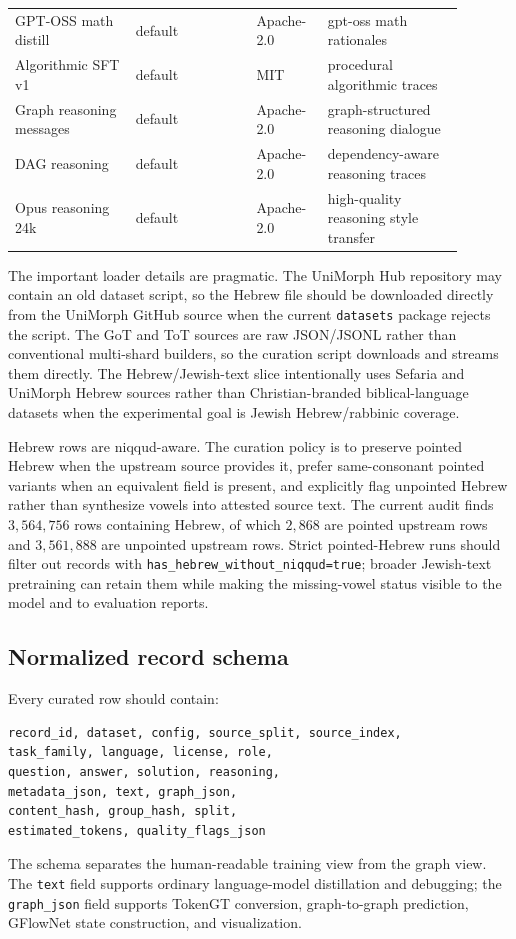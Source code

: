\documentclass[11pt]{article}
\theoremstyle{definition}
\theoremstyle{plain}
\theoremstyle{remark}
\numberwithin{equation}{section}
\begin{document}
{\begin{longtable}{>{\raggedright\arraybackslash}p{0.24\linewidth}>{\raggedright\arraybackslash}p{0.24\linewidth}>{\raggedright\arraybackslash}p{0.14\linewidth}>{\raggedright\arraybackslash}p{0.27\linewidth}}
GPT-OSS math distill & default & Apache-2.0 & gpt-oss math rationales \\
Algorithmic SFT v1 & default & MIT & procedural algorithmic traces \\
Graph reasoning messages & default & Apache-2.0 & graph-structured reasoning dialogue \\
DAG reasoning & default & Apache-2.0 & dependency-aware reasoning traces \\
Opus reasoning 24k & default & Apache-2.0 & high-quality reasoning style transfer \\
\bottomrule
\end{longtable}
}

The important loader details are pragmatic.  The UniMorph Hub repository may contain an old dataset script, so the Hebrew file should be downloaded directly from the UniMorph GitHub source when the current \texttt{datasets} package rejects the script.  The GoT and ToT sources are raw JSON/JSONL rather than conventional multi-shard builders, so the curation script downloads and streams them directly.  The Hebrew/Jewish-text slice intentionally uses Sefaria and UniMorph Hebrew sources rather than Christian-branded biblical-language datasets when the experimental goal is Jewish Hebrew/rabbinic coverage.

Hebrew rows are niqqud-aware.  The curation policy is to preserve pointed Hebrew when the upstream source provides it, prefer same-consonant pointed variants when an equivalent field is present, and explicitly flag unpointed Hebrew rather than synthesize vowels into attested source text.  The current audit finds $3{,}564{,}756$ rows containing Hebrew, of which $2{,}868$ are pointed upstream rows and $3{,}561{,}888$ are unpointed upstream rows.  Strict pointed-Hebrew runs should filter out records with \texttt{has\_hebrew\_without\_niqqud=true}; broader Jewish-text pretraining can retain them while making the missing-vowel status visible to the model and to evaluation reports.

\subsection{Normalized record schema}

Every curated row should contain:
\begin{verbatim}
record_id, dataset, config, source_split, source_index,
task_family, language, license, role,
question, answer, solution, reasoning,
metadata_json, text, graph_json,
content_hash, group_hash, split,
estimated_tokens, quality_flags_json
\end{verbatim}
The schema separates the human-readable training view from the graph view.  The \texttt{text} field supports ordinary language-model distillation and debugging; the \texttt{graph\_json} field supports TokenGT conversion, graph-to-graph prediction, GFlowNet state construction, and visualization.
\end{document}
